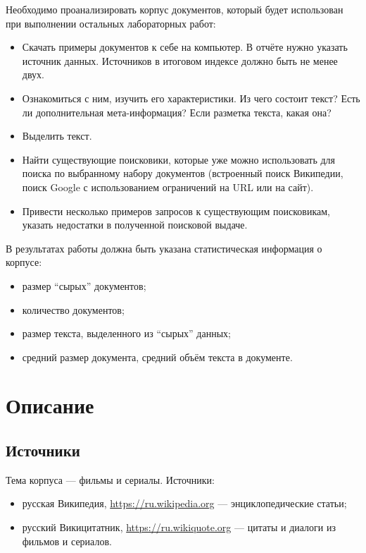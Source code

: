 \documentclass[12pt,a4paper,oneside,fleqn]{article}
\begin{document}
Необходимо проанализировать корпус документов, который будет использован при выполнении остальных лабораторных работ:
\begin{itemize}
    \item Скачать примеры документов к себе на компьютер. В отчёте нужно указать источник данных. Источников в итоговом индексе должно быть не менее двух.
    \item Ознакомиться с ним, изучить его характеристики. Из чего состоит текст? Есть ли дополнительная мета-информация? Если разметка текста, какая она?
    \item Выделить текст.
    \item Найти существующие поисковики, которые уже можно использовать для поиска по выбранному набору документов (встроенный поиск Википедии, поиск Google с использованием ограничений на URL или на сайт).
    \item Привести несколько примеров запросов к существующим поисковикам, указать недостатки в полученной поисковой выдаче.
\end{itemize}

В результатах работы должна быть указана статистическая информация о корпусе:
\begin{itemize}
    \item размер \enquote{сырых} документов;
    \item количество документов;
    \item размер текста, выделенного из \enquote{сырых} данных;
    \item средний размер документа, средний объём текста в документе.
\end{itemize}

\pagebreak

\section{Описание}

\subsection{Источники}

Тема корпуса --- фильмы и сериалы. Источники:

\begin{itemize}
    \item русская Википедия, \url{https://ru.wikipedia.org} --- энциклопедические статьи;
    \item русский Викицитатник, \url{https://ru.wikiquote.org} --- цитаты и диалоги из фильмов и сериалов.
\end{itemize}
\end{document}
